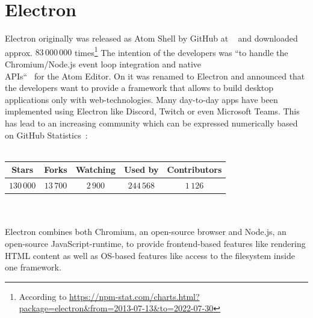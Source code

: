 \section{Electron}
\label{sec:electron}
Electron originally was released as Atom Shell by GitHub at ~\cite{githubReleaseV010} and downloaded approx. $83\,000\,000$ times\footnote{According to \url{https://npm-stat.com/charts.html?package=electron&from=2013-07-13&to=2022-07-30}}
The intention of the developers was ``to handle the Chromium/Node.js event loop integration and native\\APIs``~\cite{sawicki_2015} for the Atom Editor.
On  it was renamed to Electron and announced that the developers want to provide a framework that allows to build desktop applications only with web-technologies.
Many day-to-day apps have been implemented using Electron like Discord, Twitch or even Microsoft Teams.
This has lead to an increasing community which can be expressed numerically based on GitHub Statistics~\cite{GithubElectron}: \\ \\
\begin{tabular} {| c | c | c | c | c |}
    \label{tab:electron:statistics}
    Stars      & Forks     & Watching & Used by    & Contributors \\ \hline
    $130\,000$ & $13\,700$ & $2\,900$ & $244\,568$ & $1\,126$
\end{tabular} \\ \\
Electron combines both Chromium, an open-source browser and Node.js, an open-source JavaScript-runtime, to provide frontend-based features like rendering \ac{HTML} content as well as \ac{OS}-based features like access to the filesystem inside one framework.
